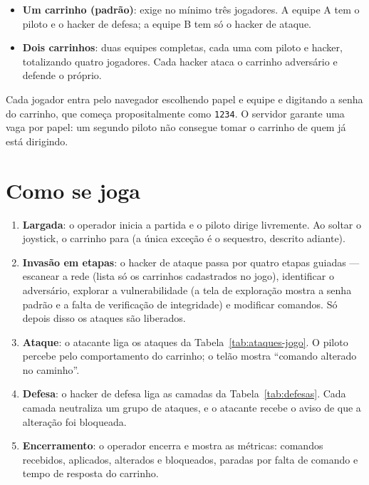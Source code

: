 \documentclass[12pt,openright,oneside,a4paper,english,brazil]{abntex2}
\begin{document}
\begin{itemize}
  \item \textbf{Um carrinho (padrão)}: exige no mínimo três jogadores. A equipe A tem o piloto e o hacker de defesa; a equipe B tem só o hacker de ataque.
  \item \textbf{Dois carrinhos}: duas equipes completas, cada uma com piloto e hacker, totalizando quatro jogadores. Cada hacker ataca o carrinho adversário e defende o próprio.
\end{itemize}

Cada jogador entra pelo navegador escolhendo papel e equipe e digitando a senha do carrinho, que começa propositalmente como \texttt{1234}. O servidor garante uma vaga por papel: um segundo piloto não consegue tomar o carrinho de quem já está dirigindo.

\section{Como se joga}

\begin{enumerate}
  \item \textbf{Largada}: o operador inicia a partida e o piloto dirige livremente. Ao soltar o joystick, o carrinho para (a única exceção é o sequestro, descrito adiante).
  \item \textbf{Invasão em etapas}: o hacker de ataque passa por quatro etapas guiadas --- escanear a rede (lista só os carrinhos cadastrados no jogo), identificar o adversário, explorar a vulnerabilidade (a tela de exploração mostra a senha padrão e a falta de verificação de integridade) e modificar comandos. Só depois disso os ataques são liberados.
  \item \textbf{Ataque}: o atacante liga os ataques da Tabela~\ref{tab:ataques-jogo}. O piloto percebe pelo comportamento do carrinho; o telão mostra \enquote{comando alterado no caminho}.
  \item \textbf{Defesa}: o hacker de defesa liga as camadas da Tabela~\ref{tab:defesas}. Cada camada neutraliza um grupo de ataques, e o atacante recebe o aviso de que a alteração foi bloqueada.
  \item \textbf{Encerramento}: o operador encerra e mostra as métricas: comandos recebidos, aplicados, alterados e bloqueados, paradas por falta de comando e tempo de resposta do carrinho.
\end{enumerate}
\end{document}
